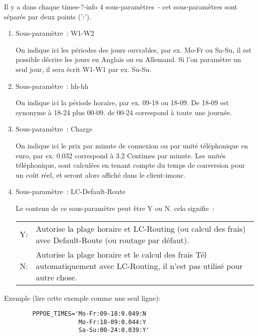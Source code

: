 \begin{description}
Il y a dans chaque times-?-info 4 sous-paramètres~- cet sous-paramètres sont
séparés par deux points (':').

\begin{enumerate}
\item Sous-paramètre~: W1-W2

  On indique ici les périodes des jours ouvrables, par ex. Mo-Fr ou Sa-Su,
  il est possible décrire les jours en Anglais ou en Allemand. Si l'on
  paramètre un seul jour, il sera écrit W1-W1 par ex. Su-Su.

\item Sous-paramètre~: hh-hh

  On indique ici la période horaire, par ex. 09-18 ou 18-09. De 18-09 est
  synonyme à 18-24 plus 00-09. de 00-24 correspond à toute une journée.


\item Sous-paramètre~: Charge

  On indique ici le prix par minute de connexion ou par unité téléphonique
  en euro, par ex. 0.032 correspond à 3.2 Centimes par minute. Les unités
  téléphonique, sont calculées en tenant compte du temps de conversion pour
  un coût réel, et seront alors affiché dans le client-imonc.

\item Sous-paramètre~: LC-Default-Route

  Le contenu de ce sous-paramètre peut être Y ou N. cela signifie~:

  \begin{tabular}[h!]{lp{11cm}}
    Y: & Autorise la plage horaire et LC-Routing (ou calcul des frais)
      avec Default-Route (ou routage par défaut).\\

    N: & Autorise la plage horaire et le calcul des frais Tél automatiquement
      avec LC-Routing, il n'est pas utilisé pour autre chose. \\
            \end{tabular}

\end{enumerate}

Exemple (lire cette exemple comme une seul ligne):

\begin{example}
\begin{verbatim}
        PPPOE_TIMES='Mo-Fr:09-18:0.049:N
                     Mo-Fr:18-09:0.044:Y
                     Sa-Su:00-24:0.039:Y'
\end{verbatim}
\end{example}


\end{description}
